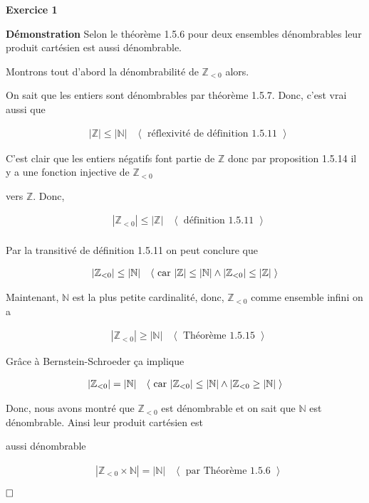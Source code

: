 \documentclass{article}
\newcommand{\tuple}[1]{\ensuremath{\left\langle #1 \right\rangle}}
\begin{document}
    
\textbf{Exercice 1}

\vspace{0.5cm}

\textbf{Démonstration} Selon le théorème 1.5.6 pour deux ensembles dénombrables leur produit cartésien est aussi dénombrable.

Montrons tout d'abord la dénombrabilité de $\mathbb{Z}_{< 0}$ alors.

On sait que les entiers sont dénombrables par théorème 1.5.7. Donc, c'est vrai aussi que

\begin{align*}
&|\mathbb{Z}| \leq |\mathbb{N}|
&\tuple{ \text{ réflexivité de définition 1.5.11 } }
\end{align*}

C’est clair que les entiers négatifs font partie de $\mathbb{Z}$ donc par proposition 1.5.14 il y a une fonction injective de $\mathbb{Z}_{< 0}$ 

vers $\mathbb{Z}$. Donc,

\begin{align*}
&|\mathbb{Z}_{< 0}| \leq |\mathbb{Z}|
&\tuple{ \text{ définition 1.5.11 } }
\\
\end{align*}

Par la transitivé de définition 1.5.11 on peut conclure que

\begin{align*}
&|\mathbb{Z}_{< 0}| \leq |\mathbb{N}|
&\tuple{ \text{ car } |\mathbb{Z}| \leq |\mathbb{N}| \land  |\mathbb{Z}_{< 0}| \leq |\mathbb{Z}| \hspace{.1cm} }
\end{align*}

Maintenant, $\mathbb{N}$ est la plus petite cardinalité, donc, $\mathbb{Z}_{< 0}$ comme ensemble infini on a

\begin{align*}
&|\mathbb{Z}_{< 0}| \geq |\mathbb{N}|
&\tuple{ \text{ Théorème 1.5.15 } }
\end{align*}

Grâce à Bernstein-Schroeder ça implique

\begin{align*}
&|\mathbb{Z}_{< 0}| = |\mathbb{N}|
&\tuple{\text{ car } |\mathbb{Z}_{<0}| \leq |\mathbb{N}| \land  |\mathbb{Z}_{<0} \geq |\mathbb{N}| \hspace{.1cm} }
\end{align*}

Donc, nous avons montré que $\mathbb{Z}_{< 0}$ est dénombrable et on sait que $\mathbb{N}$ est dénombrable. Ainsi leur produit cartésien est 

aussi dénombrable

\begin{align*}
&|\mathbb{Z}_{<0} \times \mathbb{N}| = |\mathbb{N}|
&\tuple{ \text{ par Théorème 1.5.6 } }
\end{align*}

$\hfill \square$
\end{document}
